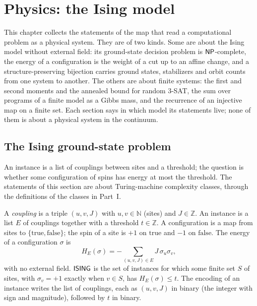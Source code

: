 \chapter{Physics: the Ising model}
\label{chap:physics}

This chapter collects the statements of the map that read a computational problem as a physical
system. They are of two kinds. Some are about the Ising model without external field: its
ground-state decision problem is $\mathsf{NP}$-complete, the energy of a configuration is the weight of a
cut up to an affine change, and a structure-preserving bijection carries ground states,
stabilizers and orbit counts from one system to another. The others are about finite systems:
the first and second moments and the annealed bound for random $3$-SAT, the sum over programs of
a finite model as a Gibbs mass, and the recurrence of an injective map on a finite set. Each
section says in which model its statements live; none of them is about a physical system in the
continuum.

\section{The Ising ground-state problem}
\label{sec:physics-ising-problem}

An instance is a list of couplings between sites and a threshold; the question is whether some
configuration of spins has energy at most the threshold. The statements of this section are about
Turing-machine complexity classes, through the definitions of the classes in Part~I.

\begin{definition}
  \label{def:physics-ising-problem}
  \leanok
  A \emph{coupling} is a triple $(u, v, J)$ with $u, v \in \mathbb{N}$ (sites) and
  $J \in \mathbb{Z}$. An instance is a list $E$ of couplings together with a threshold
  $t \in \mathbb{Z}$. A configuration is a map from sites to $\{\mathrm{true}, \mathrm{false}\}$; the
  spin of a site is $+1$ on $\mathrm{true}$ and $-1$ on $\mathrm{false}$. The energy of a
  configuration $\sigma$ is
  \[
    H_E(\sigma) = -\sum_{(u,v,J) \in E} J\, \sigma_u \sigma_v ,
  \]
  with no external field. $\mathsf{ISING}$ is the set of instances for which some finite set $S$ of sites,
  with $\sigma_v = +1$ exactly when $v \in S$, has $H_E(\sigma) \le t$. The encoding of an instance
  writes the list of couplings, each as $(u, v, J)$ in binary (the integer with sign and magnitude),
  followed by $t$ in binary.
  \own{}
\end{definition}


